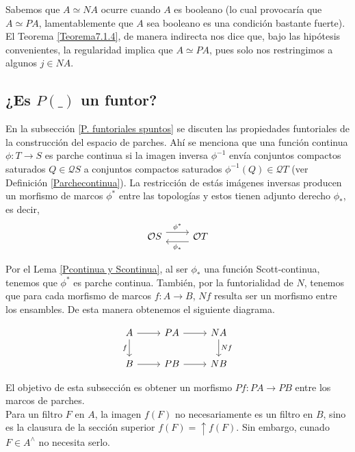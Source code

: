 Sabemos que $A\simeq NA$ ocurre cuando $A$ es booleano (lo cual provocaría que $A\simeq PA$, lamentablemente que $A$ sea booleano es una condición bastante fuerte). El Teorema \ref{Teorema7.1.4}, de manera indirecta nos dice que, bajo las hipótesis convenientes, la regularidad implica que $A\simeq PA$, pues solo nos restringimos a algunos $j\in NA$.

\subsection{¿Es $P( \_ )$ un funtor?}

En la subsección \ref{P. funtoriales spuntos} se discuten las propiedades funtoriales de la construcción del espacio de parches. Ahí se menciona que una función continua $\phi\colon T\to S$ es parche continua si la imagen inversa $\phi^{-1}$ envía conjuntos compactos saturados $Q\in \mathcal{Q}S$ a conjuntos compactos saturados $\phi^{-1}(Q)\in \mathcal{Q}T$ (ver Definición \ref{Parchecontinua}). La restricción de estás imágenes inversas producen un morfismo de marcos $\phi^*$ entre las topologías y estos tienen adjunto derecho $\phi_*$, es decir,
\[\begin{tikzcd}
	{\mathcal{O}S} & {\mathcal{O}T}
	\arrow["{\phi^*}", shift left=2, from=1-1, to=1-2]
	\arrow["{\phi_*}", shift left=2, from=1-2, to=1-1]
\end{tikzcd}\]

Por el Lema \ref{Pcontinua y Scontinua}, al ser $\phi_*$ una función Scott-continua, tenemos que $\phi^*$ es parche continua. También, por la funtorialidad de $N$, tenemos que para cada morfismo de marcos $f\colon A\to B$, $Nf$ resulta ser un morfismo entre los ensambles. De esta manera obtenemos el siguiente diagrama.

\[\begin{tikzcd}
	A & PA & NA \\
	B & PB & NB
	\arrow[from=1-1, to=1-2]
	\arrow["f"', from=1-1, to=2-1]
	\arrow[from=1-2, to=1-3]
	\arrow["Nf", from=1-3, to=2-3]
	\arrow[from=2-1, to=2-2]
	\arrow[from=2-2, to=2-3]
\end{tikzcd}\]

El objetivo de esta subsección es obtener un morfismo $Pf\colon PA\to PB$ entre los marcos de parches.\\

Para un filtro $F$ en $A$, la imagen $f(F)$ no necesariamente es un filtro en $B$, sino es la clausura de la sección superior $f(F)=\uparrow f(F)$. Sin embargo, cunado $F\in A^\wedge$ no necesita serlo.\\

